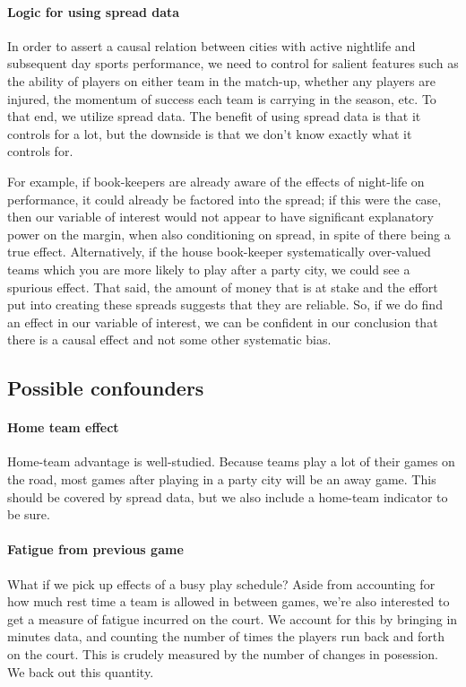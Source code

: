 \documentclass[letterpaper,12pt]{article}
\begin{document}
\paragraph{Logic for using spread data}
In order to assert a causal relation between cities with active nightlife 
and subsequent day sports performance, we need to control for salient
features such as the ability of players on either team in the match-up,
whether any players are injured, the momentum of success each team is carrying
in the season, etc. To that end, we utilize spread data. The benefit of
using spread data is that it controls for a lot, but the downside is that
we don't know exactly what it controls for. 

For example, if book-keepers
are already aware of the effects of night-life on performance, it could
already be factored into the spread; if this were the case, then our variable
of interest would not appear to have significant explanatory power
on the margin, when also conditioning on spread, in spite of there being
a true effect. Alternatively,
if the house book-keeper systematically over-valued
teams which you are more likely to play after a party city,
we could see a spurious effect.
That said, the amount of money that is at stake and the effort put into creating these spreads 
suggests that they are reliable. So, if we do find an effect in our variable of interest,
we can be confident in our conclusion that there is a causal effect and not some
other systematic bias.

\subsection{Possible confounders}

\paragraph{Home team effect}
Home-team advantage is well-studied.\cite{jones07, jones08}  
Because teams play a lot of their games on the road,
most games after playing in a party city will be an away game.
This should be covered by spread data, but we also include
a home-team indicator to be sure.

\paragraph{Fatigue from previous game}
What if we pick up effects of a busy play schedule?
Aside from accounting for how much rest time a team is allowed in between games,
we're also interested to get a measure of
fatigue incurred on the court.
We account for this by bringing in minutes data, and counting the number of 
times the players run back and forth on the court. This is crudely measured
by the number of changes in posession. We back out this quantity.
\end{document}
